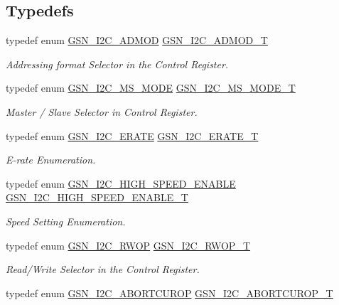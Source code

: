 \subsection*{Typedefs}
\begin{DoxyCompactItemize}
\item 
typedef enum \hyperlink{a00649_gab1800d5ab13710494cd9a9e6eac6e0ab}{GSN\_\-I2C\_\-ADMOD} \hyperlink{a00649_gac3021fdaf2e11a7972d53d5292ad5f26}{GSN\_\-I2C\_\-ADMOD\_\-T}
\begin{DoxyCompactList}\small\item\em Addressing format Selector in the Control Register. \end{DoxyCompactList}\item 
typedef enum \hyperlink{a00649_ga56cbec3c8496c0e235150e2779966e47}{GSN\_\-I2C\_\-MS\_\-MODE} \hyperlink{a00649_ga72605883ea904f4ee6c310a25142a0ab}{GSN\_\-I2C\_\-MS\_\-MODE\_\-T}
\begin{DoxyCompactList}\small\item\em Master / Slave Selector in Control Register. \end{DoxyCompactList}\item 
typedef enum \hyperlink{a00649_gaa477e3e9e89468cf508ed6ea99357639}{GSN\_\-I2C\_\-ERATE} \hyperlink{a00649_gad834947ae5685696ffea0ecec904b16e}{GSN\_\-I2C\_\-ERATE\_\-T}
\begin{DoxyCompactList}\small\item\em E-\/rate Enumeration. \end{DoxyCompactList}\item 
typedef enum \hyperlink{a00649_ga75fb1bfd3b52d6ceab35ff62418c6bf6}{GSN\_\-I2C\_\-HIGH\_\-SPEED\_\-ENABLE} \hyperlink{a00649_ga78dfa46a936df5bba07b4ba66cdfca62}{GSN\_\-I2C\_\-HIGH\_\-SPEED\_\-ENABLE\_\-T}
\begin{DoxyCompactList}\small\item\em Speed Setting Enumeration. \end{DoxyCompactList}\item 
typedef enum \hyperlink{a00649_ga67da6f46815f1aaf8cf6e1a35b13a02c}{GSN\_\-I2C\_\-RWOP} \hyperlink{a00649_ga0789ba469961beef75b0187cc554d801}{GSN\_\-I2C\_\-RWOP\_\-T}
\begin{DoxyCompactList}\small\item\em Read/Write Selector in the Control Register. \end{DoxyCompactList}\item 
typedef enum \hyperlink{a00649_ga2ed0e9ed554e26759140e9afffd51eb4}{GSN\_\-I2C\_\-ABORTCUROP} \hyperlink{a00649_gaee6d5c48317a97a0237257dac66b7f8f}{GSN\_\-I2C\_\-ABORTCUROP\_\-T}

\end{DoxyCompactItemize}

